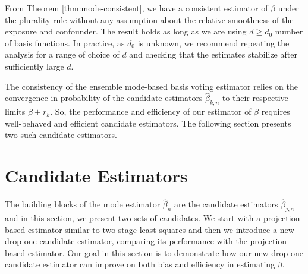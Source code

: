 \documentclass[
  12pt]{article}
\begin{document}
From Theorem \ref{thm:mode-consistent}, we have a consistent estimator of $\beta$ under the plurality rule without any assumption about the relative smoothness of the exposure and confounder. The result holds as long as we are using $d \geq d_0$ number of basis functions. In practice, as $d_0$ is unknown, we recommend repeating the analysis for a range of choice of $d$ and checking that the estimates stabilize after sufficiently large $d$. 

The consistency of the ensemble mode-based basis voting estimator relies on the convergence in probability of the candidate estimators $\hat \beta_{k,n}$ to their respective limits $\beta + r_k$. So, the performance and efficiency of our estimator of $\beta$ requires well-behaved and efficient candidate estimators. The following section presents two such candidate estimators. 

\section{Candidate Estimators}\label{sec:candidates}
The building blocks of the mode estimator $\hat \beta_n$ are the candidate estimators $\hat \beta_{j,n}$ and in this section, we present two sets of candidates. We start with a projection-based estimator similar to two-stage least squares and then we introduce a new drop-one candidate estimator, comparing its performance with the projection-based estimator.  Our goal in this section is to demonstrate how our new drop-one candidate estimator can improve on both bias and efficiency in estimating $\beta$. 
\end{document}
